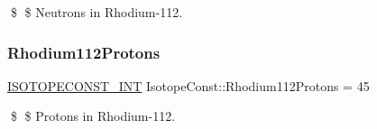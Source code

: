 \$ \$ Neutrons in Rhodium-\/112. \mbox{\label{group___isotope_const-_rhodium-_rh112_ga7af00fd8c3b238700227b809d31aafbb}} 
\subsubsection{\texorpdfstring{Rhodium112\+Protons}{Rhodium112Protons}}
{\footnotesize\ttfamily \mbox{\hyperlink{group___isotope_const-_macros_ga5f18360b3e99483a35c32d789e62621c}{I\+S\+O\+T\+O\+P\+E\+C\+O\+N\+S\+T\+\_\+\+I\+NT}} Isotope\+Const\+::\+Rhodium112\+Protons = 45}

\$ \$ Protons in Rhodium-\/112. 